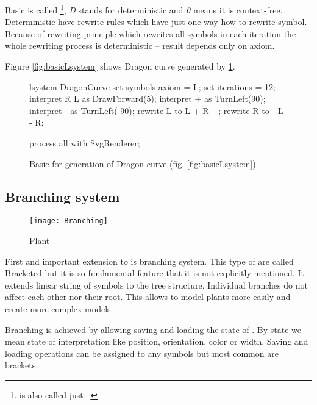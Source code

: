 Basic \lsystem is called \dzerolsystem{}\footnote{\dzerolsystem is also called just \dlsystem~\cite{Zar04}}, \emph{D} stands for deterministic and \emph{0} means it is context-free.
Deterministic \lsystems have rewrite rules which have just one way how to rewrite symbol.
Because of rewriting principle which rewrites all symbols in each iteration the whole rewriting process is deterministic -- result depends only on axiom.

Figure \ref{fig:basicLsystem} shows Dragon curve generated by \dzerolsystem \ref{fig:basicLsystemSrc}.

\begin{figure}[ht]
	\begin{Lsystem}
lsystem DragonCurve {
	set symbols axiom = L;
	set iterations = 12;
	interpret R L as DrawForward(5);
	interpret + as TurnLeft(90);
	interpret - as TurnLeft(-90);
	rewrite L to L + R +;
	rewrite R to - L - R;
}

process all with SvgRenderer;
	\end{Lsystem}
	\caption{Basic \dzerolsystem for generation of Dragon curve (fig. \ref{fig:basicLsystem})}
	\label{fig:basicLsystemSrc}
\end{figure}


\subsection{Branching system}

\begin{wrapfigure}{r}{0.32\textwidth}
	\vspace{-50pt}
	\begin{center}
	\texttt{[image: Branching]}
	\end{center}
	\caption{Plant}
	\label{fig:branching}
\end{wrapfigure}

First and important extension to \lsystems is branching system.
This type of \lsystems are called Bracketed \lsystems\cite{PL91} but it is so fundamental feature that it is not explicitly mentioned.
It extends linear string of symbols to the tree structure.
Individual branches do not affect each other nor their root.
This allows to model plants more easily and create more complex models.

Branching is achieved by allowing saving and loading the state of \lsystem.
By state we mean state of interpretation like position, orientation, color or width.
Saving and loading operations can be assigned to any symbols but most common are brackets.

